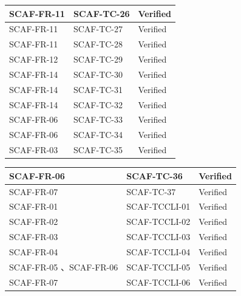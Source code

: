 \documentclass{report}
\begin{document}
\begin{tabularx}{\textwidth}{ 
  |p{}%
  |p{}%
  |p{}|%
}
  SCAF-FR-11 & SCAF-TC-26 & Verified \\
  \hline
  SCAF-FR-11 & SCAF-TC-27 & Verified \\
  \hline
  SCAF-FR-11 & SCAF-TC-28 & Verified \\
  \hline
  SCAF-FR-12 & SCAF-TC-29 & Verified \\
  \hline
  SCAF-FR-14 & SCAF-TC-30 & Verified \\
  \hline
  SCAF-FR-14 & SCAF-TC-31 & Verified \\
  \hline
  SCAF-FR-14 & SCAF-TC-32 & Verified \\
  \hline
  SCAF-FR-06 & SCAF-TC-33 & Verified \\
  \hline
  SCAF-FR-06 & SCAF-TC-34 & Verified \\
  \hline
  SCAF-FR-03 & SCAF-TC-35 & Verified \\
  \hline
\end{tabularx}
\newpage
\begin{tabularx}{\textwidth}{ 
  |p{}%
  |p{}%
  |p{}|%
}
  \hline
  SCAF-FR-06 & SCAF-TC-36 & Verified \\
  \hline
  SCAF-FR-07 & SCAF-TC-37 & Verified \\
  \hline
  SCAF-FR-01 & SCAF-TCCLI-01 & Verified \\
  \hline
  SCAF-FR-02 & SCAF-TCCLI-02 & Verified \\
  \hline
  SCAF-FR-03 & SCAF-TCCLI-03 & Verified \\
  \hline
  SCAF-FR-04 & SCAF-TCCLI-04 & Verified \\
  \hline
  SCAF-FR-05 、SCAF-FR-06 & SCAF-TCCLI-05 & Verified \\
  \hline
  SCAF-FR-07 & SCAF-TCCLI-06 & Verified \\
  \hline
\end{tabularx}
\end{document}
